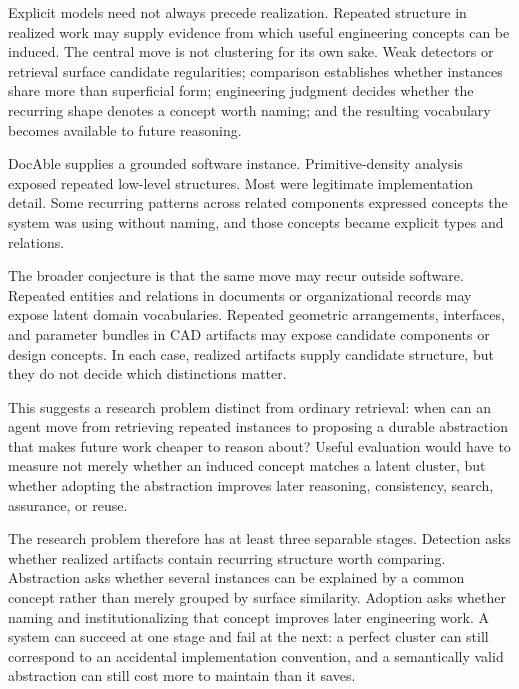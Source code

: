 

Explicit models need not always precede realization. Repeated structure in realized work may supply evidence from which useful engineering concepts can be induced. The central move is not clustering for its own sake. Weak detectors or retrieval surface candidate regularities; comparison establishes whether instances share more than superficial form; engineering judgment decides whether the recurring shape denotes a concept worth naming; and the resulting vocabulary becomes available to future reasoning.

DocAble supplies a grounded software instance. Primitive-density analysis exposed repeated low-level structures. Most were legitimate implementation detail. Some recurring patterns across related components expressed concepts the system was using without naming, and those concepts became explicit types and relations.

The broader conjecture is that the same move may recur outside software. Repeated entities and relations in documents or organizational records may expose latent domain vocabularies. Repeated geometric arrangements, interfaces, and parameter bundles in CAD artifacts may expose candidate components or design concepts. In each case, realized artifacts supply candidate structure, but they do not decide which distinctions matter.

This suggests a research problem distinct from ordinary retrieval: when can an agent move from retrieving repeated instances to proposing a durable abstraction that makes future work cheaper to reason about? Useful evaluation would have to measure not merely whether an induced concept matches a latent cluster, but whether adopting the abstraction improves later reasoning, consistency, search, assurance, or reuse.

The research problem therefore has at least three separable stages. Detection asks whether realized artifacts contain recurring structure worth comparing. Abstraction asks whether several instances can be explained by a common concept rather than merely grouped by surface similarity. Adoption asks whether naming and institutionalizing that concept improves later engineering work. A system can succeed at one stage and fail at the next: a perfect cluster can still correspond to an accidental implementation convention, and a semantically valid abstraction can still cost more to maintain than it saves.


